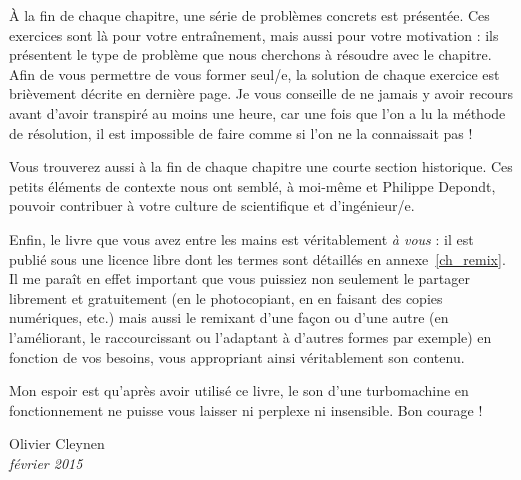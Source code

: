 À la fin de chaque chapitre, une série de problèmes concrets est présentée. Ces exercices sont là pour votre entraînement, mais aussi pour votre motivation : ils présentent le type de problème que nous cherchons à résoudre avec le chapitre. Afin de vous permettre de vous former seul/e, la solution de chaque exercice est brièvement décrite en dernière page. Je vous conseille de ne jamais y avoir recours avant d’avoir transpiré au moins une heure, car une fois que l’on a lu la méthode de résolution, il est impossible de faire comme si l’on ne la connaissait pas !

Vous trouverez aussi à la fin de chaque chapitre une courte section historique. Ces petits éléments de contexte nous ont semblé, à moi-même et Philippe Depondt, pouvoir contribuer à votre culture de scientifique et d’ingénieur/e. 

Enfin, le livre que vous avez entre les mains est véritablement \emph{à vous} : il est publié sous une licence libre dont les termes sont détaillés en annexe~\ref{ch_remix}. Il me paraît en effet important que vous puissiez non seulement le partager librement et gratuitement (en le photocopiant, en en faisant des copies numériques, etc.) mais aussi le remixant d’une façon ou d’une autre (en l’améliorant, le raccourcissant ou l’adaptant à d’autres formes par exemple) en fonction de vos besoins, vous appropriant ainsi véritablement son contenu.

Mon espoir est qu’après avoir utilisé ce livre, le son d’une turbomachine en fonctionnement ne puisse vous laisser ni perplexe ni insensible. Bon courage !

\begin{flushright}Olivier Cleynen\\ \textit{février 2015}\end{flushright}
